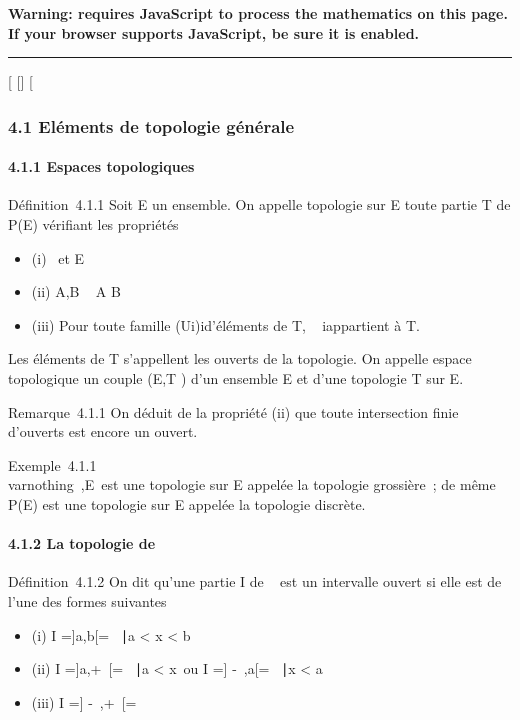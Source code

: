 \textbf{Warning: 
requires JavaScript to process the mathematics on this page.\\ If your
browser supports JavaScript, be sure it is enabled.}

\begin{center}\rule{3in}{0.4pt}\end{center}

{[}
{[}{]}
{[}

\subsubsection{4.1 Eléments de topologie générale}

\paragraph{4.1.1 Espaces topologiques}

Définition~4.1.1 Soit E un ensemble. On appelle topologie sur E toute
partie T de P(E) vérifiant les propriétés

\begin{itemize}
\itemsep1pt\parskip0pt
\item
  (i) \varnothing~\inT et E \inT
\item
  (ii) A,B \inT \rigtharrow~ A \bigcap B \inT
\item
  (iii) Pour toute famille (Ui)i\inI d'éléments de T,
  \⋃ ~
  i\inIUi appartient à T.
\end{itemize}

Les éléments de T s'appellent les ouverts de la topologie. On appelle
espace topologique un couple (E,T ) d'un ensemble E et d'une topologie T
sur E.

Remarque~4.1.1 On déduit de la propriété (ii) que toute intersection
finie d'ouverts est encore un ouvert.

Exemple~4.1.1 \\varnothing~,E\ est une topologie
sur E appelée la topologie grossière~; de même P(E) est une topologie
sur E appelée la topologie discrète.

\paragraph{4.1.2 La topologie de ~}

Définition~4.1.2 On dit qu'une partie I de ~ est un intervalle ouvert si
elle est de l'une des formes suivantes

\begin{itemize}
\itemsep1pt\parskip0pt
\item
  (i) I ={]}a,b{[}= \x \in {}~∣a
  \textless{} x \textless{} b\
\item
  (ii) I ={]}a,+\infty~{[}= \x \in
  ~∣a \textless{} x\ ou I
  ={]} -\infty~,a{[}= \x \in {}~∣x
  \textless{} a\
\item
  (iii) I ={]} -\infty~,+\infty~{[}= ~
\end{itemize}

